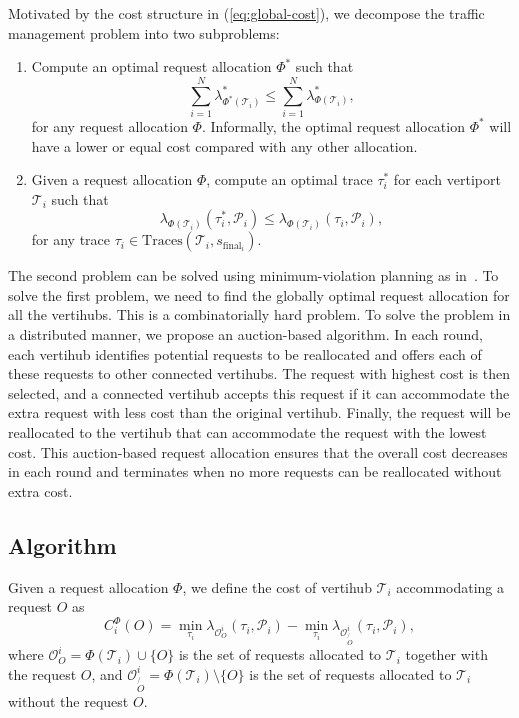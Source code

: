 Motivated by the cost structure in (\ref{eq:global-cost}), we decompose the traffic management problem into two subproblems:
\begin{enumerate}
	\item Compute an optimal request allocation $\Phi^*$ such that
	\begin{equation*}
		\sum_{i=1}^N \lambda_{\Phi^*(\mathcal{T}_i)}^* \leq \sum_{i=1}^N \lambda_{\Phi(\mathcal{T}_i)}^*,
	\end{equation*}
	for any request allocation $\Phi$. Informally, the optimal request allocation $\Phi^{*}$ will have a lower or equal cost compared with any other allocation. 
	\item Given a request allocation $\Phi$, compute an optimal trace $\tau_i^*$ for each vertiport $\mathcal{T}_i$ such that
	\begin{equation*}
		\lambda_{\Phi(\mathcal{T}_i)}(\tau_i^*, \mathcal{P}_i) \leq \lambda_{\Phi(\mathcal{T}_i)}(\tau_i, \mathcal{P}_i),
	\end{equation*}
	for any trace $\tau_i \in \text{Traces}(\mathcal{T}_i,s_{\text{final}_i})$.
\end{enumerate}
The second problem can be solved using minimum-violation planning as in~\cite{Tumova:2013:ACC,Tumova:2013:LCS}.
To solve the first problem, we need to find the globally optimal request allocation for all the vertihubs. This is a combinatorially hard problem. To solve the problem in a distributed manner, we propose an auction-based algorithm. In each round, each vertihub identifies potential requests to be reallocated and offers each of these requests to other connected vertihubs.  The request with highest cost is then selected, and a connected vertihub accepts this request if it can accommodate the extra request with less cost than the original vertihub. Finally, the request will be reallocated to the vertihub that can accommodate the request with the lowest cost. This auction-based request allocation ensures that the overall cost decreases in each round and terminates when no more requests can be reallocated without extra cost.

\subsection{Algorithm} 
Given a request allocation $\Phi$, we define the cost of vertihub $\mathcal{T}_i$ accommodating a request $O$ as
\begin{equation}
	C_i^\Phi(O) = \min_{\tau_i} \lambda_{\mathcal{O}^i_O}(\tau_i, \mathcal{P}_i) - \min_{\tau_i} \lambda_{\mathcal{O}^i_{\not{O}}}(\tau_i, \mathcal{P}_i),
\end{equation}
where $\mathcal{O}^i_O = \Phi(\mathcal{T}_i) \cup \{O\}$ is the set of requests allocated to $\mathcal{T}_i$ together with the request $O$, and $\mathcal{O}^i_{\not{O}} = \Phi(\mathcal{T}_i) \setminus \{O\}$ is the set of requests allocated to $\mathcal{T}_i$ without the request $O$.

